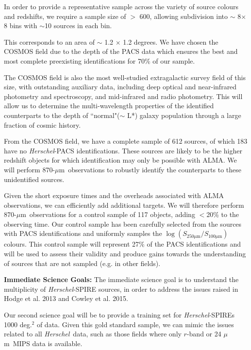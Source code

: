 \documentclass[12pt,a4paper]{article}
\newcommand{\herschel}{{\it Herschel}}
\newcommand{\micron}{$\mu$m}
\begin{document}
In order to provide a representative sample across the variety of source colours and redshifts, we require a sample size of $>$ 600, allowing subdivision into $\sim$ 8$\times$8 bins with $\sim$10 sources in each bin.

This corresponds to an area of $\sim$ 1.2 $\times$ 1.2 degrees. We have chosen the COSMOS field due to the depth of the PACS data which ensures the best and most complete preexisting identifications for 70\% of our sample.

The COSMOS field is also the most well-studied extragalactic survey field of this size, with outstanding auxiliary data, including deep optical and
near-infrared photometry and spectroscopy, and mid-infrared and radio
photometry. This will allow us to determine the multi-wavelength properties of the identified counterparts to the depth of ``normal"($\sim$ L*) galaxy population through a large fraction of cosmic history. 

From the COSMOS field, we have a complete sample of 612 sources, of which 183 have no \herschel-PACS identifications. These sources are likely to be the higher redshift objects for which identification may only be possible with ALMA. We will perform 870-\micron\ observations to robustly identify the counterparts to these unidentified sources.

Given the short exposure times and the overheads associated with ALMA observations, we can efficiently add additional targets. We will therefore perform 870-\micron\ observations for a control sample of 117 objects, adding $<$20\% to the observing time. Our control sample has been carefully selected from the sources with PACS identifications and uniformly samples the $\log (S_{250 \mathrm{\mu m}}/S_{100\mathrm{\mu m}})$ colours. This control sample will represent 27\% of the PACS identifications and will be used to assess their validity and produce gains towards the understanding of sources that are not sampled (e.g. in other fields). %
%

{\bf Immediate Science Goals:}
The immediate science goal is to understand the multiplicity of \herschel-SPIRE sources, in order to address the issues raised in Hodge et al. 2013 and Cowley et al. 2015.

Our second science goal will be to provide a training set for \herschel-SPIREs 1000 deg.$^2$ of data. Given this gold standard sample, we can mimic the issues related to all \herschel\ data, such as those fields where only $r$-band or 24 \micron\ MIPS data is available.
\end{document}
